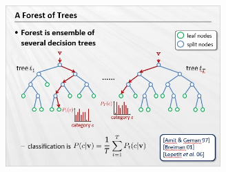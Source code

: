 \documentclass[journal]{IEEEtran}
\begin{document}
\includegraphics[width=3.25in,height=3.25in,clip,keepaspectratio]{RandomForest.jpg}
\end{document}
